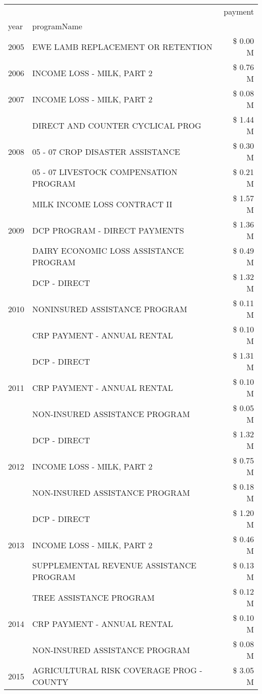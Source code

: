 \begin{tabular}{llr}
\toprule
 &  & payment \\
year & programName &  \\
\midrule
2005 & EWE LAMB REPLACEMENT OR RETENTION & \$ 0.00 M \\
\cline{1-3}
2006 & INCOME LOSS - MILK, PART 2 & \$ 0.76 M \\
\cline{1-3}
2007 & INCOME LOSS - MILK, PART 2 & \$ 0.08 M \\
\cline{1-3}
\multirow[t]{3}{*}{2008} & DIRECT AND COUNTER CYCLICAL PROG & \$ 1.44 M \\
 & 05 - 07 CROP DISASTER ASSISTANCE & \$ 0.30 M \\
 & 05 - 07 LIVESTOCK COMPENSATION PROGRAM & \$ 0.21 M \\
\cline{1-3}
\multirow[t]{3}{*}{2009} & MILK INCOME LOSS CONTRACT II & \$ 1.57 M \\
 & DCP PROGRAM - DIRECT PAYMENTS & \$ 1.36 M \\
 & DAIRY ECONOMIC LOSS ASSISTANCE PROGRAM & \$ 0.49 M \\
\cline{1-3}
\multirow[t]{3}{*}{2010} & DCP - DIRECT & \$ 1.32 M \\
 & NONINSURED ASSISTANCE PROGRAM & \$ 0.11 M \\
 & CRP PAYMENT - ANNUAL RENTAL & \$ 0.10 M \\
\cline{1-3}
\multirow[t]{3}{*}{2011} & DCP - DIRECT & \$ 1.31 M \\
 & CRP PAYMENT - ANNUAL RENTAL & \$ 0.10 M \\
 & NON-INSURED ASSISTANCE PROGRAM & \$ 0.05 M \\
\cline{1-3}
\multirow[t]{3}{*}{2012} & DCP - DIRECT & \$ 1.32 M \\
 & INCOME LOSS - MILK, PART 2 & \$ 0.75 M \\
 & NON-INSURED ASSISTANCE PROGRAM & \$ 0.18 M \\
\cline{1-3}
\multirow[t]{3}{*}{2013} & DCP - DIRECT & \$ 1.20 M \\
 & INCOME LOSS - MILK, PART 2 & \$ 0.46 M \\
 & SUPPLEMENTAL REVENUE ASSISTANCE PROGRAM & \$ 0.13 M \\
\cline{1-3}
\multirow[t]{3}{*}{2014} & TREE ASSISTANCE PROGRAM & \$ 0.12 M \\
 & CRP PAYMENT - ANNUAL RENTAL & \$ 0.10 M \\
 & NON-INSURED ASSISTANCE PROGRAM & \$ 0.08 M \\
\cline{1-3}
\multirow[t]{3}{*}{2015} & AGRICULTURAL RISK COVERAGE PROG - COUNTY & \$ 3.05 M \\

\end{tabular}

